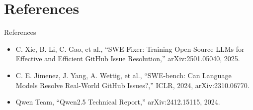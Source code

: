 \documentclass{beamer}
\begin{document}
\section{References}
\begin{frame}{References}
\footnotesize
\begin{itemize}
\item C. Xie, B. Li, C. Gao, et al., ``SWE-Fixer: Training Open-Source LLMs for Effective and Efficient GitHub Issue Resolution,'' arXiv:2501.05040, 2025.
\item C. E. Jimenez, J. Yang, A. Wettig, et al., ``SWE-bench: Can Language Models Resolve Real-World GitHub Issues?,'' ICLR, 2024, arXiv:2310.06770.
\item Qwen Team, ``Qwen2.5 Technical Report,'' arXiv:2412.15115, 2024.
\end{itemize}
\end{frame}
\begin{frame}\vfill{}\vfill\end{frame}
\end{document}
